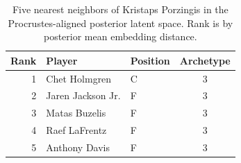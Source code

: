 \begin{table}[htbp]
  \centering\small
  \begin{tabular}{rllc}
    \toprule
    Rank & Player & Position & Archetype \\
    \midrule
    1 & Chet Holmgren & C & 3 \\
    2 & Jaren Jackson Jr. & F & 3 \\
    3 & Matas Buzelis & F & 3 \\
    4 & Raef LaFrentz & F & 3 \\
    5 & Anthony Davis & F & 3 \\
    \bottomrule
  \end{tabular}
  \caption{Five nearest neighbors of Kristaps Porzingis in the Procrustes-aligned posterior latent space. Rank is by posterior mean embedding distance.}
  \label{tab:Kristaps_Porzingis_neighbors}
\end{table}

